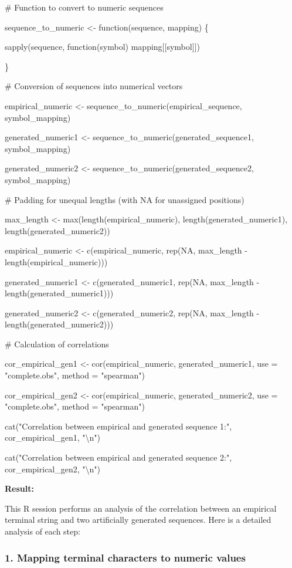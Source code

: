 \documentclass[
]{article}
\begin{document}
\# Function to convert to numeric sequences

sequence\_to\_numeric \textless- function(sequence, mapping) \{

sapply(sequence, function(symbol) mapping{[}{[}symbol{]}{]})

\}

\# Conversion of sequences into numerical vectors

empirical\_numeric \textless- sequence\_to\_numeric(empirical\_sequence,
symbol\_mapping)

generated\_numeric1 \textless-
sequence\_to\_numeric(generated\_sequence1, symbol\_mapping)

generated\_numeric2 \textless-
sequence\_to\_numeric(generated\_sequence2, symbol\_mapping)

\# Padding for unequal lengths (with NA for unassigned positions)

max\_length \textless- max(length(empirical\_numeric),
length(generated\_numeric1), length(generated\_numeric2))

empirical\_numeric \textless- c(empirical\_numeric, rep(NA, max\_length
- length(empirical\_numeric)))

generated\_numeric1 \textless- c(generated\_numeric1, rep(NA,
max\_length - length(generated\_numeric1)))

generated\_numeric2 \textless- c(generated\_numeric2, rep(NA,
max\_length - length(generated\_numeric2)))

\# Calculation of correlations

cor\_empirical\_gen1 \textless- cor(empirical\_numeric,
generated\_numeric1, use = "complete.obs", method = "spearman")

cor\_empirical\_gen2 \textless- cor(empirical\_numeric,
generated\_numeric2, use = "complete.obs", method = "spearman")

cat("Correlation between empirical and generated sequence 1:",
cor\_empirical\_gen1, "\textbackslash n")

cat("Correlation between empirical and generated sequence 2:",
cor\_empirical\_gen2, "\textbackslash n")

\textbf{Result:}

This R session performs an analysis of the correlation between an
empirical terminal string and two artificially generated sequences. Here
is a detailed analysis of each step:

\subsubsection{\texorpdfstring{\textbf{1. Mapping terminal characters to
numeric
values}}{1. Mapping terminal characters to numeric values}}\label{mapping-terminal-characters-to-numeric-values}
\end{document}
